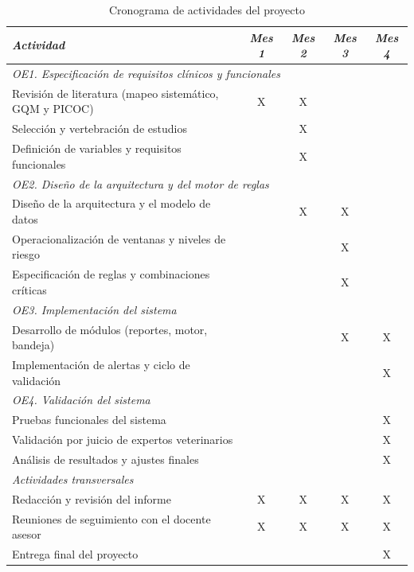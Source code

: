 \documentclass[stu, spanish]{apa7}
\begin{document}
\begin{table}[htbp]
\caption{Cronograma de actividades del proyecto}
\label{tab:cronograma}
\footnotesize
\begin{tabular}{@{}p{8cm}cccc@{}}
\toprule
\textit{Actividad} & \textit{Mes 1} & \textit{Mes 2} & \textit{Mes 3} & \textit{Mes 4} \\
\midrule
\multicolumn{5}{l}{\textit{OE1. Especificaci\'{o}n de requisitos cl\'{i}nicos y funcionales}} \\
Revisi\'{o}n de literatura (mapeo sistem\'{a}tico, GQM y PICOC) & X & X &   &   \\
Selecci\'{o}n y vertebraci\'{o}n de estudios          &   & X &   &   \\
Definici\'{o}n de variables y requisitos funcionales  &   & X &   &   \\
\midrule
\multicolumn{5}{l}{\textit{OE2. Dise\~{n}o de la arquitectura y del motor de reglas}} \\
Dise\~{n}o de la arquitectura y el modelo de datos    &   & X & X &   \\
Operacionalizaci\'{o}n de ventanas y niveles de riesgo &   &   & X &   \\
Especificaci\'{o}n de reglas y combinaciones cr\'{i}ticas &   &   & X &   \\
\midrule
\multicolumn{5}{l}{\textit{OE3. Implementaci\'{o}n del sistema}} \\
Desarrollo de m\'{o}dulos (reportes, motor, bandeja)  &   &   & X & X \\
Implementaci\'{o}n de alertas y ciclo de validaci\'{o}n &   &   &   & X \\
\midrule
\multicolumn{5}{l}{\textit{OE4. Validaci\'{o}n del sistema}} \\
Pruebas funcionales del sistema                       &   &   &   & X \\
Validaci\'{o}n por juicio de expertos veterinarios     &   &   &   & X \\
An\'{a}lisis de resultados y ajustes finales          &   &   &   & X \\
\midrule
\multicolumn{5}{l}{\textit{Actividades transversales}} \\
Redacci\'{o}n y revisi\'{o}n del informe              & X & X & X & X \\
Reuniones de seguimiento con el docente asesor        & X & X & X & X \\
Entrega final del proyecto                            &   &   &   & X \\
\bottomrule
\end{tabular}
\end{table}
\end{document}

